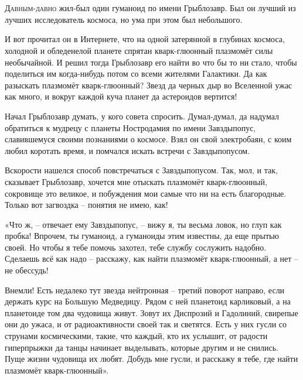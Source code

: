 \documentclass[ebook,oneside,final,openright]{memoir}
\begin{document}
\chapter{}
 \lettrine{Д}{авным-давно} жил-был один гуманоид по имени Грыблозавр. Был он лучший из лучших исследователь космоса, но ума при этом был небольшого.\par
\par
И вот прочитал он в Интернете, что на одной затерянной в глубинах космоса, холодной и обледенелой планете спрятан кварк-глюонный плазмомёт силы необычайной. И решил тогда Грыблозавр его найти во что бы то ни стало, чтобы поделиться им когда-нибудь потом со всеми жителями Галактики. Да как разыскать плазмомёт кварк-глюонный? Звезд да черных дыр во Вселенной ужас как много, и вокруг каждой куча планет да астероидов вертится!\par
\par
Начал Грыблозавр думать, у кого совета спросить. Думал-думал, да надумал обратиться к мудрецу с планеты Ностродамия по имени Завздыпопус, славившемуся своими познаниями о космосе. Взял он свой электробаян, с коим любил коротать время, и помчался искать встречи с Завздыпопусом.\par
\par
Вскорости нашелся способ повстречаться с Завздыпопусом. Так, мол, и так, сказывает Грыблозавр, хочется мне отыскать плазмомёт кварк-глюонный, сокровище это великое, и побуждения мои самые что ни на есть благородные. Только вот загвоздка – понятия не имею, как!\par
\par
«Что ж, – отвечает ему Завздыпопус, – вижу я, ты весьма ловок, но глуп как пробка! Впрочем, ты гуманоид, а гуманоиды этим известны, да еще прытью своей. Но чтобы я тебе помочь захотел, тебе службу сослужить надобно. Сделаешь всё как надо – расскажу, как найти плазмомёт кварк-глюонный, а нет – не обессудь!\par
\par
Внемли! Есть недалеко тут звезда нейтронная – третий поворот направо, если держать курс на Большую Медведицу. Рядом с ней планетоид карликовый, а на планетоиде том два чудовища живут. Зовут их Диспрозий и Гадолиний, свирепые они до ужаса, и от радиоактивности своей так и светятся. Есть у них гусли со струнами космическими, такие, что каждый, кто их услышит, от радости гиперпрыжки да танцы начинает выделывать, которые другим и не снились. Пуще жизни чудовища их любят. Добудь мне гусли, и расскажу я тебе, где найти плазмомёт кварк-глюонный».\par
\end{document}
